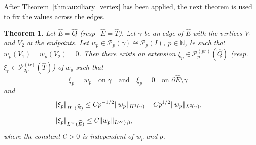 \documentclass[english, 12pt, a4paper, sci, utf8, a-2b, online]{aaltothesis}
\theoremstyle{definition}
\theoremstyle{plain}
\newtheorem{theorem}{Theorem}[section]
\DeclarePairedDelimiter\norm{\lVert}{\rVert}
\numberwithin{equation}{section}
\begin{document}
After Theorem~\ref{thm:auxiliary_vertex} has been applied,
the next theorem is used to fix the values across the edges.
\begin{theorem}
    \label{thm:auxiliary_edge}
    Let $\widehat{E} = \widehat{Q}$ (resp.\ $\widehat{E} = \widehat{T}$).
    Let $\gamma$ be an edge of $\widehat{E}$ with the vertices $V_1$ and $V_2$
    at the endpoints.
    Let $w_p \in \mathcal{P}_p(\gamma) \cong \mathcal{P}_p(I)$,
    $p \in \mathbb{N}$, be such that $w_p(V_1) = w_p(V_2) = 0$.
    Then there exists an extension $\xi_p \in \mathcal{P}_p^{(pr)}(\widehat{Q})$
    (resp.\ $\xi_p \in \mathcal{P}_{2p}^{(tr)}(\widehat{T})$)
    of $w_p$ such that
    \begin{equation}
        \label{eq:auxiliary_edge_boundary}
        \xi_p = w_p \text{ } \text{ on } \gamma
        \quad \text{and} \quad
        \xi_p = 0 \text{ } \text{ on } \partial \widehat{E} \setminus \gamma
    \end{equation}
    and
    \begin{align}
        \label{eq:auxiliary_edge_res1}
        &\norm{\xi_p}_{H^1(\widehat{E})}
        \leq C p^{-1/2} \norm{w_p}_{H^1(\gamma)}
            + C p^{1/2} \norm{w_p}_{L^2(\gamma)}, \\[0.5em]
        \label{eq:auxiliary_edge_res2}
        &\norm{\xi_p}_{L^{\infty}(\widehat{E})}
        \leq C \norm{w_p}_{L^{\infty}(\gamma)},
    \end{align}
    where the constant $C > 0$ is independent of $w_p$ and $p$.
\end{theorem}
\end{document}
